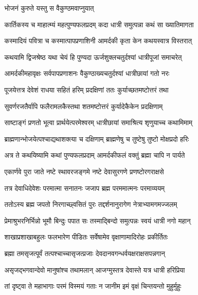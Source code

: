 \onelineshloka
{भोजनं कुरुते यस्तु स वैकुण्ठमवाप्नुयात्} %





\twolineshloka
{कार्तिकस्य च माहात्म्यं महत्पुण्यफलप्रदम्}
{कदा धात्री समुत्पन्ना कथं सा ख्यातिमागता} %

\twolineshloka
{कस्मादियं पवित्रा च कस्मात्पापप्रणाशिनी}
{आमर्दकी कृता केन कथयस्वात्र विस्तरात्} %


\twolineshloka
{कथयामि द्विजश्रेष्ठ यथा चेयं हि पुण्यदा}
{ऊर्जशुक्लचतुर्दश्यां धात्रीपूजां समाचरेत्} %

\twolineshloka
{आमर्दकीमहावृक्षः सर्वपापप्रणाशनः}
{वैकुण्ठाख्यचतुर्दश्यां धात्रीछायां गतो नरः} %

\twolineshloka
{पूजयेत्तत्र देवेशं राधया सहितं हरिम्}
{प्रदक्षिणां ततः कुर्याच्छतमष्टोत्तरं तथा} %

\twolineshloka
{सुवर्णरजतैर्वापि फलैरामलकैस्तथा}
{शतमष्टोत्तरं कुर्यादेकैकेन प्रदक्षिणाम्} %

\twolineshloka
{साष्टाङ्गं प्रणतो भूत्वा प्रार्थयेत्परमेश्वरम्}
{धात्रीछायां समाश्रित्य शृणुयाच्च कथामिमाम्} %

\twolineshloka
{ब्राह्मणान्भोजयेत्पश्चाद्यथाशक्त्या च दक्षिणाम्}
{ब्राह्मणेषु च तुष्टेषु तुष्टो मोक्षप्रदो हरिः} %

\twolineshloka
{अत्र ते कथयिष्यामि कथां पुण्यफलप्रदाम्}
{आमर्दकीफलं वक्तुं ब्रह्मा चापि न पार्यते} %


\twolineshloka
{एकार्णवे पुरा जाते नष्टे स्थावरजङ्गमे}
{नष्टे देवासुरगणे प्रणष्टोरगराक्षसे} %

\twolineshloka
{तत्र देवाधिदेवेशः परमात्मा सनातनः}
{जजाप ब्रह्म परममात्मनः परमाव्ययम्} %

\twolineshloka
{ततोऽस्य ब्रह्म जपतो निरगाच्छ्वसितं पुरः}
{तद्दर्शनानुरागेण नेत्राभ्यामगमज्जलम्} %

\twolineshloka
{प्रेमाश्रुभरनिर्भिन्नो भूमौ बिन्दुः पपात सः}
{तस्माद्बिन्दो समुत्पन्नः स्वयं धात्री नगो महान्} %

\twolineshloka
{शाखाप्रशाखाबहुलः फलभारेण पीडितः}
{सर्वेषामेव वृक्षाणामादिरोहः प्रकीर्तितः} %

\twolineshloka
{ब्रह्मा तमसृजत्पूर्वं तत्पश्चाच्चासृजत्प्रजाः}
{देवदानवगन्धर्वयक्षराक्षसपन्नगान्} %

\twolineshloka
{असृजद्भगवान्देवो मानुषांश्च तथामलान्}
{आजग्मुस्तत्र देवास्ते यत्र धात्री हरिप्रिया} %

\twolineshloka
{तां दृष्ट्वा ते महाभागाः परमं विस्मयं गताः}
{न जानीम इमं वृक्षं चिन्तयन्तो मुहुर्मुहुः} %

